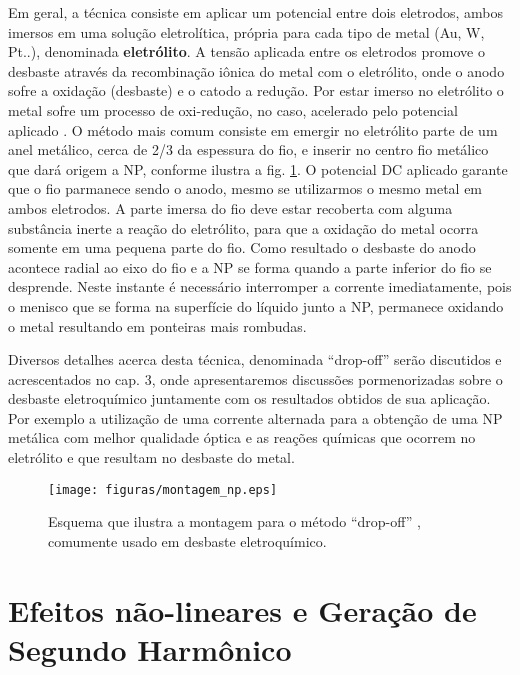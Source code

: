 Em geral, a técnica consiste em aplicar um potencial entre dois eletrodos, ambos imersos em uma solução eletrolítica, própria para cada tipo de metal (Au, W, Pt..), denominada \textbf{eletrólito}. A tensão aplicada entre os eletrodos promove o desbaste através da recombinação iônica do metal com o eletrólito, onde o anodo sofre a oxidação (desbaste) e o catodo a redução. Por estar imerso no eletrólito o metal sofre um processo de oxi-redução, no caso, acelerado pelo potencial aplicado \cite{oliveira}. O método mais comum consiste em emergir no eletrólito parte de um anel metálico, cerca de 2/3 da espessura do fio, e inserir no centro fio metálico que dará origem a NP, conforme ilustra a fig. \ref{fig:montagem_desbaste}. O potencial DC aplicado garante que o fio parmanece sendo o anodo, mesmo se utilizarmos o mesmo metal em ambos eletrodos. A parte imersa do fio deve estar recoberta com alguma substância inerte a reação do eletrólito, para que a oxidação do metal ocorra somente em uma pequena parte do fio. Como resultado o desbaste do anodo acontece radial ao eixo do fio e a NP se forma quando a parte inferior do fio se desprende. Neste instante é necessário interromper a corrente imediatamente, pois o menisco que se forma na superfície do líquido junto a NP, permanece oxidando o metal resultando em ponteiras mais rombudas.

Diversos detalhes acerca desta técnica, denominada ``drop-off'' serão discutidos e acrescentados no cap. 3, onde apresentaremos discussões pormenorizadas sobre o desbaste eletroquímico juntamente com os resultados obtidos de sua aplicação. Por exemplo a utilização de uma corrente alternada para a obtenção de uma NP metálica com melhor qualidade óptica e as reações químicas que ocorrem no eletrólito e que resultam no desbaste do metal.

\begin{figure}[h]
\centering
\texttt{[image: figuras/montagem\_np.eps]}
\caption{Esquema que ilustra a montagem para o método ``drop-off'' \cite{boyle,picardi}, comumente usado em desbaste eletroquímico.}
\label{fig:montagem_desbaste}
\end{figure}

\section{Efeitos não-lineares e Geração de Segundo Harmônico}
\paragraph{}

